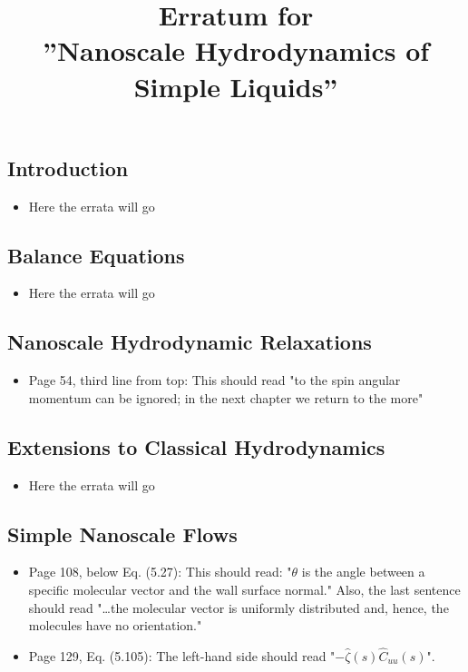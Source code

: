 \documentclass{article}
\title{Erratum for \\ ''Nanoscale Hydrodynamics of Simple Liquids''}
\date{}
\begin{document}
\maketitle

\subsection*{Introduction}
\begin{itemize}
\item Here the errata will go
\end{itemize}

\subsection*{Balance Equations}
\begin{itemize}
\item Here the errata will go
\end{itemize}

\subsection*{Nanoscale Hydrodynamic Relaxations}
\begin{itemize}
\item Page 54, third line from top: This should read "to the spin angular momentum can be ignored; in the next chapter we return to the more"
\end{itemize}

\subsection*{Extensions to Classical Hydrodynamics}
\begin{itemize}
\item Here the errata will go
\end{itemize}

\subsection*{Simple Nanoscale Flows}
\begin{itemize}
\item Page 108, below Eq. (5.27): This should read: "$\theta$ is the angle between a specific molecular vector 
and the wall surface normal." Also, the last sentence should read "\ldots the molecular vector is uniformly distributed and, hence, 
the molecules have no orientation."  
\item Page 129, Eq. (5.105): The left-hand side should read "$-\widehat{\zeta}(s)\widehat{C}_{uu}(s)$".
\end{itemize}
\end{document}
